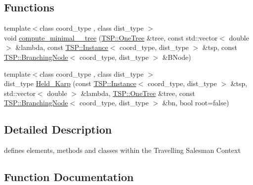 \subsection*{Functions}
\begin{DoxyCompactItemize}
\item 
{\footnotesize template$<$class coord\+\_\+type , class dist\+\_\+type $>$ }\\void \hyperlink{namespaceTSP_a99deb3994481658afb2f3d6fc4a56ac8}{compute\+\_\+minimal\+\_\+\_\+tree} (\hyperlink{classTSP_1_1OneTree}{T\+S\+P\+::\+One\+Tree} \&tree, const std\+::vector$<$ double $>$ \&lambda, const \hyperlink{classTSP_1_1Instance}{T\+S\+P\+::\+Instance}$<$ coord\+\_\+type, dist\+\_\+type $>$ \&tsp, const \hyperlink{classTSP_1_1BranchingNode}{T\+S\+P\+::\+Branching\+Node}$<$ coord\+\_\+type, dist\+\_\+type $>$ \&B\+Node)
\item 
{\footnotesize template$<$class coord\+\_\+type , class dist\+\_\+type $>$ }\\dist\+\_\+type \hyperlink{namespaceTSP_aa02b5d2fd460500a7e1e98b02da33813}{Held\+\_\+\+Karp} (const \hyperlink{classTSP_1_1Instance}{T\+S\+P\+::\+Instance}$<$ coord\+\_\+type, dist\+\_\+type $>$ \&tsp, std\+::vector$<$ double $>$ \&lambda, \hyperlink{classTSP_1_1OneTree}{T\+S\+P\+::\+One\+Tree} \&tree, const \hyperlink{classTSP_1_1BranchingNode}{T\+S\+P\+::\+Branching\+Node}$<$ coord\+\_\+type, dist\+\_\+type $>$ \&bn, bool root=false)
\end{DoxyCompactItemize}


\subsection{Detailed Description}
defines elements, methods and classes within the Travelling Salesman Context 

\subsection{Function Documentation}
\mbox{\label{namespaceTSP_a99deb3994481658afb2f3d6fc4a56ac8}} 
